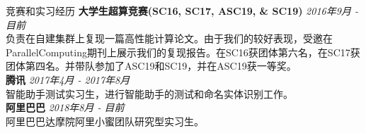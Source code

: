 \documentclass{resume} %
\begin{document}
\begin{rSection}{竞赛和实习经历}
    \textbf{大学生超算竞赛(SC16, SC17, ASC19, \& SC19)} \hfill {\em 2016年9月 - 目前}\\
    负责在自建集群上复现一篇高性能计算论文。由于我们的较好表现，受邀在ParallelComputing期刊上展示我们的复现报告。在SC16获团体第六名，在SC17获团体第四名。并带队参加了ASC19和SC19，并在ASC19获一等奖。 \\
    \textbf{腾讯} \hfill {\em 2017年4月 - 2017年8月} \\
    智能助手测试实习生，进行智能助手的测试和命名实体识别工作。\\
    \textbf{阿里巴巴} \hfill {\em 2018年8月 - 目前}\\
    阿里巴巴达摩院阿里小蜜团队研究型实习生。
\end{rSection}
\end{document}
